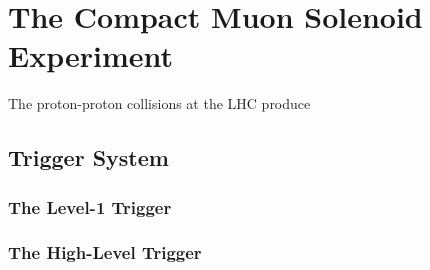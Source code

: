 \chapter{The Compact Muon Solenoid Experiment}\label{ch:cms}

The proton-proton collisions at the LHC produce 

\section{Trigger System}\label{sec:trigger}

\subsection{The Level-1 Trigger}\label{subsec:L1_trig}

\subsection{The High-Level Trigger}\label{subsec:hlt}